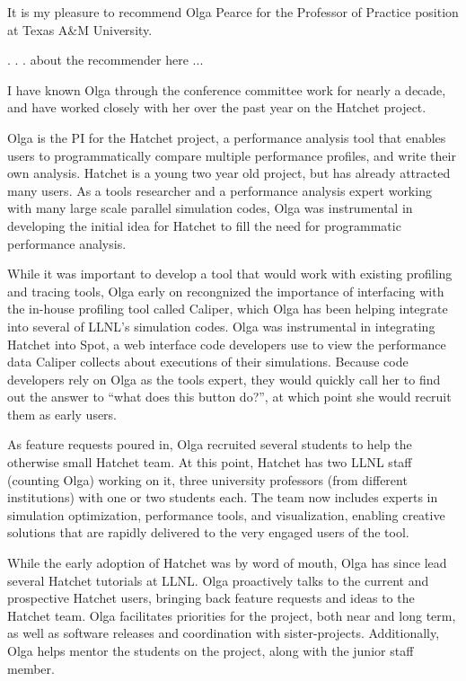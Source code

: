 \documentclass[11pt]{article}
\begin{document}
It is my pleasure to recommend Olga Pearce for the Professor of Practice position at Texas A\&M University.

. . . about the recommender here ...

I have known Olga through the conference committee work for nearly a decade, and have worked closely with her over the past year on the Hatchet project.

Olga is the PI for the Hatchet project, a performance analysis tool that enables users to programmatically compare multiple performance profiles, and write their own analysis.
Hatchet is a young two year old project, but has already attracted many users.
As a tools researcher and a performance analysis expert working with many large scale parallel simulation codes,
Olga was instrumental in developing the initial idea for Hatchet to fill the need for programmatic performance analysis.

While it was important to develop a tool that would work with existing profiling and tracing tools,
Olga early on recongnized the importance of interfacing with the in-house profiling tool called Caliper,
which Olga has been helping integrate into several of LLNL's simulation codes.
Olga was instrumental in integrating Hatchet into Spot,
a web interface code developers use to view the performance data Caliper collects about
executions of their simulations.
Because code developers rely on Olga as the tools expert,
they would quickly call her to find out the answer to
``what does this button do?'', at which point she would recruit them
as early users.

As feature requests poured in, Olga recruited several students
to help the otherwise small Hatchet team.
At this point, Hatchet has two LLNL staff (counting Olga) working on it,
three university professors (from different institutions)
with one or two students each.
The team now includes experts in simulation optimization, performance tools,
and visualization, enabling creative solutions that are
rapidly delivered to the very engaged users of the tool.

While the early adoption of Hatchet was by word of mouth,
Olga has since lead several Hatchet tutorials at LLNL.
Olga proactively talks to the current and prospective Hatchet users,
bringing back feature requests and ideas to the Hatchet team.
Olga facilitates priorities for the project,
both near and long term, as well as
software releases and coordination with sister-projects.
Additionally, Olga helps mentor the students on the project,
along with the junior staff member.
\end{document}
